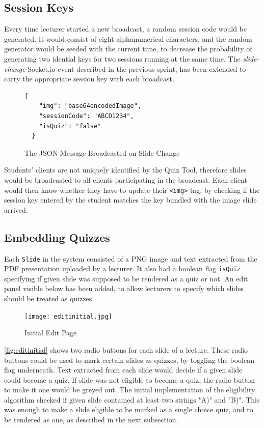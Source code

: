 \subsection{Session Keys}
Every time lecturer started a new broadcast, a random session code would be generated.
It would consist of eight alphanumerical characters, and the random generator would
be seeded with the current time, to decrease the probability of generating two idential
keys for two sessions running at the same time. The \textit{slide-change} Socket.io event
described in the previous sprint, has been extended to carry the appropriate session key
with each broadcast.

\begin{figure}[h!]
  \begin{lstlisting}[basicstyle=\small]
  {
    "img": "base64encodedImage",
    "sessionCode": "ABCD1234",
    "isQuiz": "false"
  }
  \end{lstlisting}
  \caption{The JSON Message Broadcasted on Slide Change}
\end{figure}

Students' clients are not uniquely identified by the Quiz Tool, therefore slides would
be broadcasted to all clients participating in the broadcast. Each client would
then know whether they have to update their \texttt{<img>} tag, by checking
if the session key entered by the student matches the key bundled with the image slide
arrived.

\subsection{Embedding Quizzes}
Each \texttt{Slide} in the system consisted of a PNG image and text extracted
from the PDF presentation uploaded by a lecturer. It also had a boolean flag
\texttt{isQuiz} specifying if given slide was supposed to be rendered as a quiz
or not. An edit panel visible below has been added, to allow lecturers to specify
which slides should be treated as quizzes.

\begin{figure}[h!]
    \centering
    \texttt{[image: editinitial.jpg]}
    \caption{Initial Edit Page}
    \label{fig:editinitial}
\end{figure}

\newpage
\autoref{fig:editinitial} shows two radio buttons for each slide of a lecture.
These radio buttons could be used to mark certain slides as quizzes, by toggling
the boolean flag underneath. Text extracted from each slide would decide if a given
slide could become a quiz. If slide was not eligible to become a quiz, the radio button
to make it one would be greyed out. The initial implementation of the eligibility
algorithm checked if given slide contained at least two strings "A)" and "B)".
This was enough to make a slide eligible to be marked as a single choice quiz, and to be rendered as one,
as described in the next subsection.

